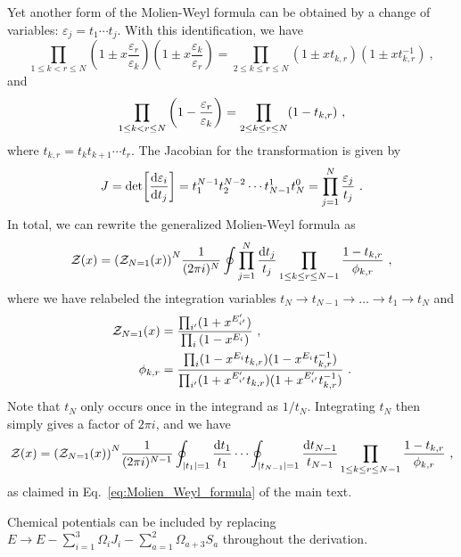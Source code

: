 \documentclass[a4paper,11pt]{article}
\begin{document}
Yet another form of the Molien-Weyl formula can be obtained by a change of variables: $\varepsilon_j = t_1\cdots t_j$. With this identification, we have
\begin{equation}
	\prod_{1\leq k<r \leq N} \left(1 \pm x\frac{\varepsilon_r}{\varepsilon_k}\right)\left(1 \pm x\frac{\varepsilon_k}{\varepsilon_r}\right) = \prod_{2\leq k\leq r \leq N} (1 \pm x t_{k,r})(1 \pm xt_{k,r}^{-1}) \ ,
\end{equation}
and
\begin{equation}
	\prod_{1\leq k<r\leq N} \qty(1-\frac{\varepsilon_r}{\varepsilon_k}) = \prod_{2\leq k\leq r\leq N} (1-t_{k,r}) \ ,
\end{equation}
% 
where $t_{k,r}=t_k t_{k+1}\cdots t_r$.
The Jacobian for the transformation is given by
% 
\begin{equation}
	J = \det[\dv{\varepsilon_i}{t_j}] = t_1^{N-1}t_2^{N-2}\cdots t_{N-1}^1 t_N^0 = \prod_{j=1}^N \frac{\varepsilon_j}{t_j} \ .
\end{equation}
% 
In total, we can rewrite the generalized Molien-Weyl formula as 
% 
\begin{equation}
	\mathcal{Z}(x) = \qty(\mathcal{Z}_{N=1}(x))^N
	\frac{1}{(2\pi i)^N} \oint \prod_{j=1}^N \frac{\dd t_j}{t_j}
	\prod_{1\leq k\leq r \leq N-1}  \frac{1-t_{k,r}}{\phi_{k,r}} \ ,
\end{equation}
% 
where we have relabeled the integration variables $t_N\to t_{N-1}\to \dotsc \to t_1\to t_N$
and
% 
\begin{align}
	\mathcal{Z}_{N=1}(x) &= \frac{\prod_{i'} (1+x^{E_{i'}'})}{\prod_i \qty(1-x^{E_i})} \ ,
\\
	\phi_{k,r} &= \frac{\prod_i (1-x^{E_i}t_{k,r})(1-x^{E_i}t_{k,r}^{-1})}{\prod_{i'} (1+x^{E_{i'}'}t_{k,r})(1+x^{E_{i'}'}t_{k,r}^{-1})} \ .
\end{align}
% 
Note that $t_N$ only occurs once in the integrand as $1/t_N$. Integrating $t_N$ then simply gives a factor of $2\pi i$, and we have
% 
\begin{equation}
	\mathcal{Z}(x) = \qty(\mathcal{Z}_{N=1}(x))^N
	\frac{1}{(2\pi i)^{N-1}} \oint_{|t_1|=1} \frac{\dd t_1}{t_1} \cdots \oint_{|t_{N-1}|=1} \frac{\dd t_{N-1}}{t_{N-1}}   \prod_{1\leq k\leq r \leq N-1}  \frac{1-t_{k,r}}{\phi_{k,r}} \ ,
\end{equation}
as claimed in Eq.\ \eqref{eq:Molien_Weyl_formula} of the main text.

Chemical potentials can be included by replacing $E \to E -\sum_{i=1}^3 \Omega_i J_i- \sum_{a=1}^2 \Omega_{a+3} S_a$ throughout the derivation.
\end{document}
